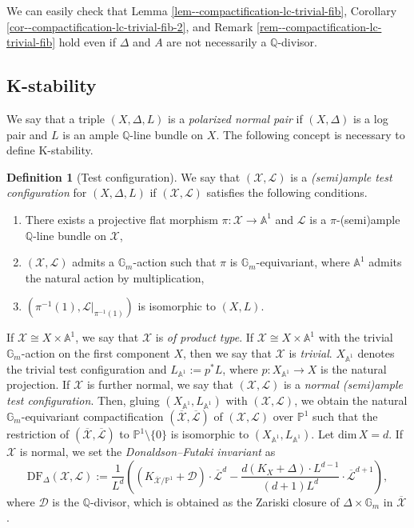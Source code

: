 \documentclass[12pt,twoside]{amsart}
\theoremstyle{definition}
\newtheorem{defn}[thm]{Definition}
\begin{document}
We can easily check that Lemma \ref{lem--compactification-lc-trivial-fib}, Corollary \ref{cor--compactification-lc-trivial-fib-2}, and Remark \ref{rem--compactification-lc-trivial-fib} hold even if $\Delta$ and $A$ are not necessarily a $\mathbb{Q}$-divisor. 

\subsection{K-stability}

We say that a triple $(X,\Delta,L)$ is a {\it polarized normal pair} if $(X,\Delta)$ is a log pair and $L$ is an ample $\mathbb{Q}$-line bundle on $X$.
The following concept is necessary to define K-stability.
\begin{defn}[Test configuration]
    We say that $(\mathcal{X},\mathcal{L})$ is a {\it (semi)ample test configuration} for $(X,\Delta,L)$ if $(\mathcal{X},\mathcal{L})$ satisfies the following conditions.
    \begin{enumerate}
        \item There exists a projective flat morphism $\pi\colon \mathcal{X}\to\mathbb{A}^1$ and $\mathcal{L}$ is a $\pi$-(semi)ample $\mathbb{Q}$-line bundle on $\mathcal{X}$,
        \item $(\mathcal{X},\mathcal{L})$ admits a $\mathbb{G}_m$-action such that $\pi$ is $\mathbb{G}_m$-equivariant, where $\mathbb{A}^1$ admits the natural action by multiplication,
        \item $(\pi^{-1}(1),\mathcal{L}|_{\pi^{-1}(1)})$ is isomorphic to $(X,L)$.
    \end{enumerate}
    If $\mathcal{X}\cong X\times\mathbb{A}^1$, we say that $\mathcal{X}$ is {\it of product type}.
    If $\mathcal{X}\cong X\times\mathbb{A}^1$ with the trivial $\mathbb{G}_m$-action on the first component $X$, then we say that $\mathcal{X}$ is {\it trivial}.
    $X_{\mathbb{A}^1}$ denotes the trivial test configuration and $L_{\mathbb{A}^1}:=p^*L$, where $p\colon X_{\mathbb{A}^1}\to X$ is the natural projection.
    If $\mathcal{X}$ is further normal, we say that $(\mathcal{X},\mathcal{L})$ is a {\it normal (semi)ample test configuration}.
    Then, gluing $(X_{\mathbb{A}^1},L_{\mathbb{A}^1})$ with $(\mathcal{X},\mathcal{L})$, we obtain the natural $\mathbb{G}_m$-equivariant compactification $(\overline{\mathcal{X}},\overline{\mathcal{L}})$ of $(\mathcal{X},\mathcal{L})$ over $\mathbb{P}^1$ such that the restriction of $(\overline{\mathcal{X}},\overline{\mathcal{L}})$ to $\mathbb{P}^1\setminus\{0\}$ is isomorphic to $(X_{\mathbb{A}^1},L_{\mathbb{A}^1})$.
    Let $\mathrm{dim}\,X=d$.
    If $\mathcal{X}$ is normal, we set the {\it Donaldson--Futaki invariant} as
    \[
    \mathrm{DF}_{\Delta}(\mathcal{X},\mathcal{L}):=\frac{1}{L^d}\left((K_{\overline{\mathcal{X}}/\mathbb{P}^1}+\mathcal{D})\cdot \overline{\mathcal{L}}^{d}-\frac{d(K_{X}+\Delta)\cdot L^{d-1}}{(d+1)L^{d}}\cdot \overline{\mathcal{L}}^{d+1}\right),
    \]
    where $\mathcal{D}$ is the $\mathbb{Q}$-divisor, which is obtained as the Zariski closure of $\Delta\times \mathbb{G}_m$ in $\overline{\mathcal{X}}$.


\end{defn}
\end{document}
